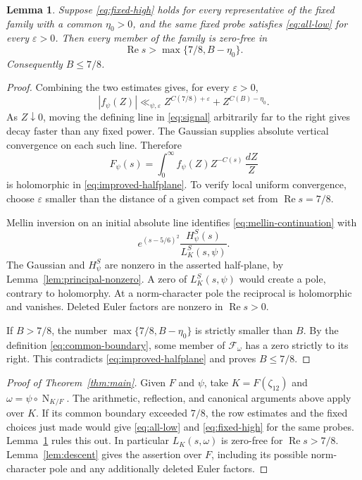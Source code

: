\documentclass[11pt,a4paper]{article}
\numberwithin{equation}{section}
\newtheorem{lemma}[theorem]{Lemma}
\theoremstyle{definition}
\theoremstyle{remark}
\newcommand{\eps}{\varepsilon}
\newcommand{\Rea}{\operatorname{Re}}
\newcommand{\Norm}{\operatorname{N}}
\newcommand{\cF}{\mathcal F}
\begin{document}
\begin{lemma}\label{lem:mellin-closure}
Suppose \eqref{eq:fixed-high} holds for every representative of the fixed
family with a common $\eta_0>0$, and the same fixed probe satisfies
\eqref{eq:all-low} for every $\eps>0$.  Then every member of the family is
zero-free in
\begin{equation}\label{eq:improved-halfplane}
 \Rea s>\max\{7/8,B-\eta_0\}.
\end{equation}
Consequently $B\leq7/8$.
\end{lemma}
\begin{proof}
Combining the two estimates gives, for every $\eps>0$,
\[
 |f_\psi(Z)|\ll_{\psi,\eps}
     Z^{C(7/8)+\eps}+Z^{C(B)-\eta_0}.
\]
As $Z\downarrow0$, moving the defining line in \eqref{eq:signal}
arbitrarily far to the right gives decay faster than any fixed power.
The Gaussian supplies absolute vertical convergence on each such line.
Therefore
\begin{equation}\label{eq:mellin-continuation}
 F_\psi(s)=\int_0^\infty f_\psi(Z)Z^{-C(s)}\,\frac{dZ}{Z}
\end{equation}
is holomorphic in \eqref{eq:improved-halfplane}.  To verify local uniform
convergence, choose $\eps$ smaller than the distance of a given compact
set from $\Rea s=7/8$.  

Mellin inversion on an initial absolute line identifies
\eqref{eq:mellin-continuation} with
\[
 e^{(s-5/6)^2}\frac{H_\psi^S(s)}{L_K^S(s,\psi)}.
\]
The Gaussian and $H_\psi^S$ are nonzero in the asserted half-plane,
by Lemma~\ref{lem:principal-nonzero}.  A zero of $L_K^S(s,\psi)$ would
create a pole, contrary to holomorphy.  At a norm-character pole the reciprocal is holomorphic and vanishes.  Deleted Euler factors
are nonzero in $\Rea s>0$.

If $B>7/8$, the number $\max\{7/8,B-\eta_0\}$ is strictly smaller
than $B$.  By the definition \eqref{eq:common-boundary}, some member of
$\cF_\omega$ has a zero strictly to its right.  This contradicts
\eqref{eq:improved-halfplane} and proves $B\leq7/8$.
\end{proof}

\begin{proof}[Proof of Theorem~\ref{thm:main}]
Given $F$ and $\psi$, take $K=F(\zeta_{12})$ and
$\omega=\psi\circ\Norm_{K/F}$.  The arithmetic, reflection, and canonical
arguments above apply over $K$.  If its common boundary exceeded $7/8$,
the row estimates and the fixed choices just made would give
\eqref{eq:all-low} and \eqref{eq:fixed-high} for the same probes.
Lemma~\ref{lem:mellin-closure} rules this out.  In particular
$L_K(s,\omega)$ is zero-free for $\Rea s>7/8$.
Lemma~\ref{lem:descent} gives the assertion over $F$, including its
possible norm-character pole and any additionally deleted Euler factors.
\end{proof}
\end{document}
